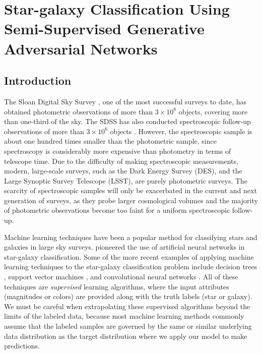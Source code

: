 \chapter{Star-galaxy Classification Using Semi-Supervised Generative Adversarial Networks}
  \label{chapter4}


\section{Introduction}
  \label{sec:introduction}

The Sloan Digital Sky Survey \citep[SDSS;][]{york2000sloan}, one of the most successful surveys to date,
has obtained photometric observations of more than $3 \times 10^8$ objects, covering more than one-third of
the sky.
The SDSS has also conducted spectroscopic follow-up observations of more than $3 \times 10^6$
objects \citep{eisenstein2011sdss}.
However, the spectroscopic sample is about one hundred times smaller than the photometric sample,
since spectroscopy is considerably more expensive than photometry in terms of telescope time.
Due to the difficulty of making spectroscopic measurements,
modern, large-scale surveys, such as the Dark Energy Survey (DES),
and the Large Synoptic Survey Telescope (LSST), are purely photometric surveys.
The scarcity of spectroscopic samples will only be exacerbated in the current and next generation of surveys,
as they probe larger cosmological volumes and the majority of photometric observations become too faint
for a uniform spectroscopic follow-up.

Machine learning techniques have been a popular method for classifying stars and galaxies in large sky surveys.
\citet{odewahn1992automated} pioneered the use of artificial neural networks in star-galaxy classification.
Some of the more recent examples of applying machine learning techniques to the star-galaxy classification problem include
decision trees \citep[\eg][]{ball2006robust},
support vector machines \citep[\eg][]{fadely2012},
and convolutional neural networks \citep{kim2017star}.
All of these techniques are \emph{supervised} learning algorithms,
where the input attributes (\eg magnitudes or colors) are provided along with the truth labels (\eg star or galaxy).
We must be careful when extrapolating these supervised algorithms beyond the limits of the labeled data,
because most machine learning methods commonly assume that the labeled samples are governed by
the same or similar underlying data distribution as the target distribution where we apply our model to make predictions.

